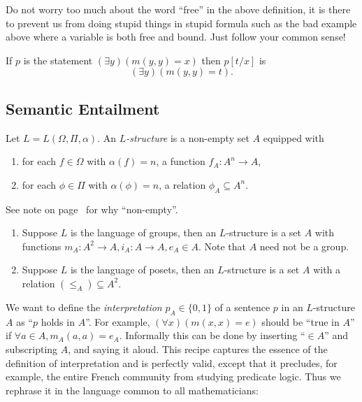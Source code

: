 \documentclass[a4paper]{article}
\begin{document}
Do not worry too much about the word ``free'' in the above definition, it is there to prevent us from doing stupid things in stupid formula such as the bad example above where a variable is both free and bound. Just follow your common sense!

\begin{eg}
  If \(p\) is the statement \((\exists y) (m(y, y) = x)\) then \(p[t/x]\) is
  \[
    (\exists y) (m(y, y) = t).
  \]
\end{eg}

\subsection{Semantic Entailment}

\begin{definition}[Structure]
  Let \(L = L(\Omega, \Pi, \alpha)\). An \emph{\(L\)-structure} is a non-empty set \(A\) equipped with
  \begin{enumerate}
  \item for each \(f \in \Omega\) with \(\alpha(f) = n\), a function \(f_A: A^n \to A\),
  \item for each \(\phi \in \Pi\) with \(\alpha(\phi) = n\), a relation \(\phi_A \subseteq A^n\).
  \end{enumerate}
\end{definition}

See note on page~\pageref{note:empty structure} for why ``non-empty''.

\begin{eg}\leavevmode
  \begin{enumerate}
  \item Suppose \(L\) is the language of groups, then an \(L\)-structure is a set \(A\) with functions \(m_A: A^2 \to A, i_A: A \to A, e_A \in A\). Note that \(A\) need not be a group.
  \item Suppose \(L\) is the language of posets, then an \(L\)-structure is a set \(A\) with a relation \((\leq_A) \subseteq A^2\).
  \end{enumerate}
\end{eg}

We want to define the \emph{interpretation} \(p_A \in \{0, 1\}\) of a sentence \(p\) in an \(L\)-structure \(A\) as ``\(p\) holds in \(A\)''. For example, \((\forall x) (m(x, x) = e)\) should be ``true in \(A\)'' if \(\forall a \in A, m_A(a, a) = e_A\). Informally this can be done by inserting ``\(\in A\)'' and subscripting \(A\), and saying it aloud. This recipe captures the essence of the definition of interpretation and is perfectly valid, except that it precludes, for example, the entire French community from studying predicate logic. Thus we rephrase it in the language common to all mathematicians:
\end{document}
